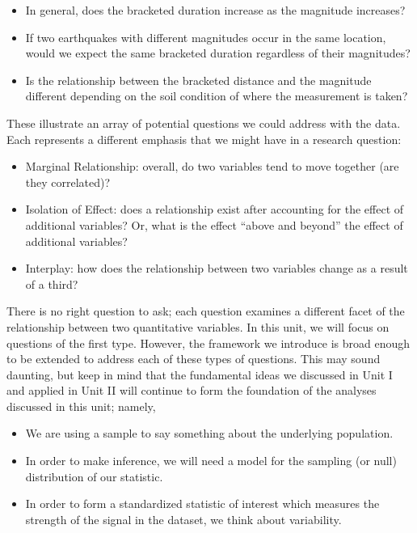\documentclass[
]{book}
\providecommand{\tightlist}{%
  \setlength{\itemsep}{0pt}\setlength{\parskip}{0pt}}
\theoremstyle{plain}
\theoremstyle{mydefn}
\theoremstyle{myexmpl}
\theoremstyle{remark}
\begin{document}
\begin{itemize}
\tightlist
\item
  In general, does the bracketed duration increase as the magnitude increases?
\item
  If two earthquakes with different magnitudes occur in the same location, would we expect the same bracketed duration regardless of their magnitudes?
\item
  Is the relationship between the bracketed distance and the magnitude different depending on the soil condition of where the measurement is taken?
\end{itemize}

These illustrate an array of potential questions we could address with the data. Each represents a different emphasis that we might have in a research question:

\begin{itemize}
\tightlist
\item
  Marginal Relationship: overall, do two variables tend to move together (are they correlated)?
\item
  Isolation of Effect: does a relationship exist after accounting for the effect of additional variables? Or, what is the effect ``above and beyond'' the effect of additional variables?
\item
  Interplay: how does the relationship between two variables change as a result of a third?
\end{itemize}

There is no right question to ask; each question examines a different facet of the relationship between two quantitative variables. In this unit, we will focus on questions of the first type. However, the framework we introduce is broad enough to be extended to address each of these types of questions. This may sound daunting, but keep in mind that the fundamental ideas we discussed in Unit I and applied in Unit II will continue to form the foundation of the analyses discussed in this unit; namely,

\begin{itemize}
\tightlist
\item
  We are using a sample to say something about the underlying population.
\item
  In order to make inference, we will need a model for the sampling (or null) distribution of our statistic.
\item
  In order to form a standardized statistic of interest which measures the strength of the signal in the dataset, we think about variability.
\end{itemize}
\end{document}
